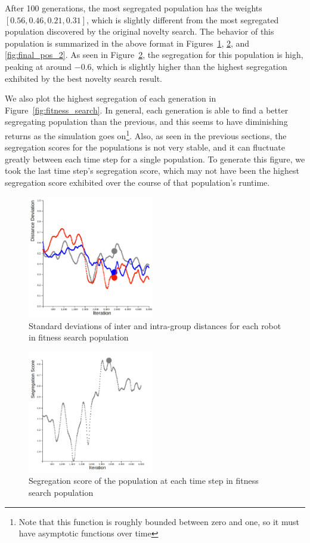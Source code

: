 After 100 generations, the most segregated population has the weights $[0.56, 0.46, 0.21, 0.31]$, which is slightly different from the most segregated population discovered by the original novelty search. 
The behavior of this population is summarized in the above format in Figures~\ref{fig:final_dev_2}, \ref{fig:final_seg_2}, and \ref{fig:final_pos_2}. 
As seen in Figure~\ref{fig:final_seg_2}, the segregation for this population is high, peaking at around $-0.6$, which is slightly higher than the highest segregation exhibited by the best novelty search result. 

We also plot the highest segregation of each generation in Figure~\ref{fig:fitness_search}. 
In general, each generation is able to find a better segregating population than the previous, and this seems to have diminishing returns as the simulation goes on\footnote{Note that this function is roughly bounded between zero and one, so it must have asymptotic functions over time}. 
Also, as seen in the previous sections, the segregation scores for the populations is not very stable, and it can fluctuate greatly between each time step for a single population. 
To generate this figure, we took the last time step's segregation score, which may not have been the highest segregation score exhibited over the course of that population's runtime. 

\begin{figure}
    \centering
    \includegraphics[width=5.5cm]{imgs/final_dev_2.png}
    \caption{Standard deviations of inter and intra-group distances for each robot in fitness search population}
    \label{fig:final_dev_2}
\end{figure}

\begin{figure}
    \centering
    \includegraphics[width=5.5cm]{imgs/final_seg_2.png}
    \caption{Segregation score of the population at each time step in fitness search population}
    \label{fig:final_seg_2}
\end{figure}


